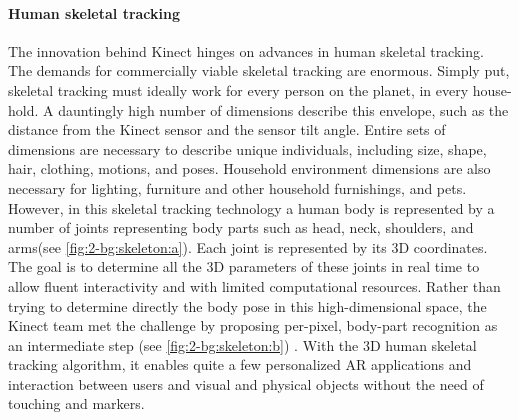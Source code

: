 \paragraph{Human skeletal tracking}
The innovation behind Kinect hinges on advances in human skeletal tracking. 
The demands for commercially viable skeletal tracking are enormous. 
Simply put, skeletal tracking must ideally work for every person on the planet, in every house-hold. A dauntingly high number of dimensions describe this envelope, such as the distance from the Kinect sensor and the sensor tilt angle. 
Entire sets of dimensions are necessary to describe unique individuals, including size, shape, hair, clothing, motions, and poses. Household environment dimensions are also necessary for lighting, furniture and other household furnishings, and pets.
However, in this skeletal tracking technology a human body is represented by a number of joints representing body parts such as head, neck, shoulders, and arms(see \figurename{\ref{fig:2-bg:skeleton:a}}). Each joint is represented by its 3D coordinates. The goal is to determine all the 3D parameters of these joints in real time to allow fluent interactivity and with limited computational resources. 
Rather than trying to determine directly the body pose in this high-dimensional space, the Kinect team met the challenge by proposing per-pixel, body-part recognition as an intermediate step (see \figurename{\ref{fig:2-bg:skeleton:b}}) \cite{Shotton2011}. With the 3D human skeletal tracking algorithm, it enables quite a few personalized AR applications and interaction between users and visual and physical objects without the need of touching and markers.
